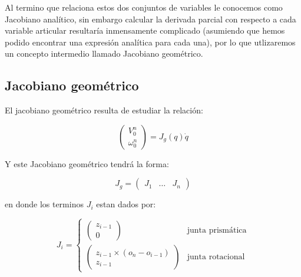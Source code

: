 \begin{multicols*}{3}
        Al termino que relaciona estos dos conjuntos de variables le conocemos como Jacobiano analítico, sin embargo calcular la derivada parcial con respecto a cada variable articular resultaría inmensamente complicado (asumiendo que hemos podido encontrar una expresión analítica para cada una), por lo que utlizaremos un concepto intermedio llamado Jacobiano geométrico.


        \subsection{Jacobiano geométrico}

            El jacobiano geométrico resulta de estudiar la relación:

            \begin{equation}
                \begin{pmatrix}
                    V_0^n \\
                    \omega_0^n
                \end{pmatrix} = J_g(q) \dot{q}
            \end{equation}

            Y este Jacobiano geométrico tendrá la forma:

            \begin{equation}
                J_g =
                \begin{pmatrix}
                    J_1 & \dots & J_n
                \end{pmatrix}
            \end{equation}

            en donde los terminos $J_i$ estan dados por:

            \begin{equation}
                J_i =
                \begin{cases}
                    \begin{pmatrix}
                        z_{i-1} \\
                        0
                    \end{pmatrix} & \text{junta prismática} \\
                    \begin{pmatrix}
                        z_{i-1} \times \left( o_n - o_{i-1} \right) \\
                        z_{i-1}
                    \end{pmatrix} & \text{junta rotacional}
                \end{cases}
            \end{equation}


\end{multicols*}
